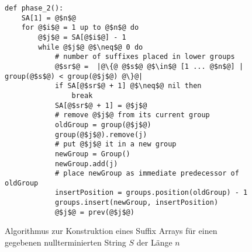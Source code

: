 \begin{figure}
\begin{verbatim}
def phase_2():
	SA[1] = @$n$@ 
	for @$i$@ = 1 up to @$n$@ do
		@$j$@ = SA[@$i$@] - 1 
		while @$j$@ @$\neq$@ 0 do
			# number of suffixes placed in lower groups
			@$sr$@ =  |@\{@ @$s$@ @$\in$@ [1 ... @$n$@] | group(@$s$@) < group(@$j$@) @\}@|
			if SA[@$sr$@ + 1] @$\neq$@ nil then 
				break
			SA[@$sr$@ + 1] = @$j$@
			# remove @$j$@ from its current group
			oldGroup = group(@$j$@)
			group(@$j$@).remove(j)
			# put @$j$@ it in a new group 
			newGroup = Group()
			newGroup.add(j)
			# place newGroup as immediate predecessor of oldGroup
			insertPosition = groups.position(oldGroup) - 1
			groups.insert(newGroup, insertPosition)
			@$j$@ = prev(@$j$@)
\end{verbatim}
\caption[Algorithmus zur Konstruktion eines Suffix Arrays für einen gegebenen nullterminierten String $S$ der Länge $n$]{Algorithmus zur Konstruktion eines Suffix Arrays für einen gegebenen nullterminierten String $S$ der Länge $n$}
\label{saca:3:code}
\end{figure}